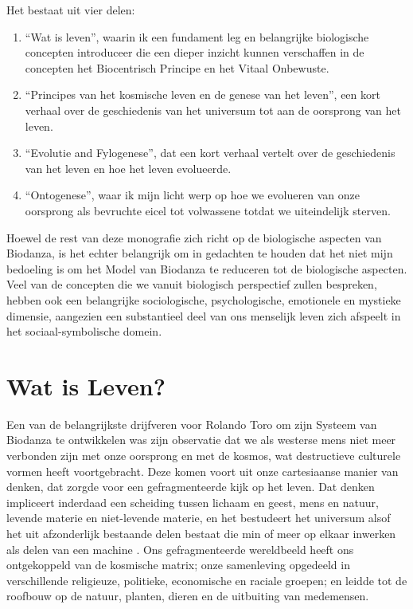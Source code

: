 \documentclass[
  11pt,
]{book}
\begin{document}
Het bestaat uit vier delen:

\begin{enumerate}
\def\labelenumi{\arabic{enumi}.}
\item
  ``Wat is leven'', waarin ik een fundament leg en belangrijke biologische concepten introduceer die een dieper inzicht kunnen verschaffen in de concepten het Biocentrisch Principe en het Vitaal Onbewuste.
\item
  ``Principes van het kosmische leven en de genese van het leven'', een kort verhaal over de geschiedenis van het universum tot aan de oorsprong van het leven.
\item
  ``Evolutie and Fylogenese'', dat een kort verhaal vertelt over de geschiedenis van het leven en hoe het leven evolueerde.
\item
  ``Ontogenese'', waar ik mijn licht werp op hoe we evolueren van onze oorsprong als bevruchte eicel tot volwassene totdat we uiteindelijk sterven.
\end{enumerate}

Hoewel de rest van deze monografie zich richt op de biologische aspecten van Biodanza, is het echter belangrijk om in gedachten te houden dat het niet mijn bedoeling is om het Model van Biodanza te reduceren tot de biologische aspecten. Veel van de concepten die we vanuit biologisch perspectief zullen bespreken, hebben ook een belangrijke sociologische, psychologische, emotionele en mystieke dimensie, aangezien een substantieel deel van ons menselijk leven zich afspeelt in het sociaal-symbolische domein.

\hypertarget{wat-is-leven}{%
\chapter{Wat is Leven?}\label{wat-is-leven}}

Een van de belangrijkste drijfveren voor Rolando Toro om zijn Systeem van Biodanza te ontwikkelen was zijn observatie dat we als westerse mens niet meer verbonden zijn met onze oorsprong en met de kosmos, wat destructieve culturele vormen heeft voortgebracht. Deze komen voort uit onze cartesiaanse manier van denken, dat zorgde voor een gefragmenteerde kijk op het leven. Dat denken impliceert inderdaad een scheiding tussen lichaam en geest, mens en natuur, levende materie en niet-levende materie, en het bestudeert het universum alsof het uit afzonderlijk bestaande delen bestaat die min of meer op elkaar inwerken als delen van een machine \citep{bohm1980}. Ons gefragmenteerde wereldbeeld heeft ons ontgekoppeld van de kosmische matrix; onze samenleving opgedeeld in verschillende religieuze, politieke, economische en raciale groepen; en leidde tot de roofbouw op de natuur, planten, dieren en de uitbuiting van medemensen.
\end{document}
